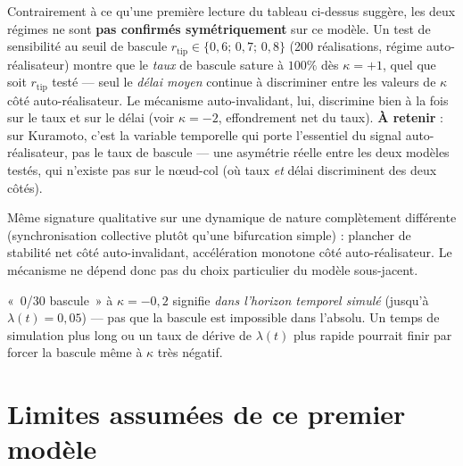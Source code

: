 \documentclass[11pt,a4paper]{article}
\begin{document}
\begin{remarque}
Contrairement à ce qu'une première lecture du tableau ci-dessus suggère,
les deux régimes ne sont \textbf{pas confirmés symétriquement} sur ce
modèle. Un test de sensibilité au seuil de bascule
$r_{\text{tip}}\in\{0{,}6;\,0{,}7;\,0{,}8\}$ (200 réalisations, régime
auto-réalisateur) montre que le \emph{taux} de bascule sature à $100\%$
dès $\kappa=+1$, quel que soit $r_{\text{tip}}$ testé — seul le
\emph{délai moyen} continue à discriminer entre les valeurs de $\kappa$
côté auto-réalisateur. Le mécanisme auto-invalidant, lui, discrimine
bien à la fois sur le taux et sur le délai (voir $\kappa=-2$, effondrement
net du taux). \textbf{À retenir} : sur Kuramoto, c'est la variable
temporelle qui porte l'essentiel du signal auto-réalisateur, pas le taux
de bascule — une asymétrie réelle entre les deux modèles testés, qui
n'existe pas sur le nœud-col (où taux \emph{et} délai discriminent des
deux côtés).
\end{remarque}

Même signature qualitative sur une dynamique de nature complètement
différente (synchronisation collective plutôt qu'une bifurcation
simple) : plancher de stabilité net côté auto-invalidant, accélération
monotone côté auto-réalisateur. Le mécanisme ne dépend donc pas du choix
particulier du modèle sous-jacent.

\begin{limite}
«~0/30 bascule~» à $\kappa=-0{,}2$ signifie \emph{dans l'horizon
temporel simulé} (jusqu'à $\lambda(t)=0{,}05$) — pas que la bascule est
impossible dans l'absolu. Un temps de simulation plus long ou un taux de
dérive de $\lambda(t)$ plus rapide pourrait finir par forcer la bascule
même à $\kappa$ très négatif.
\end{limite}

\section{Limites assumées de ce premier modèle}
\end{document}
